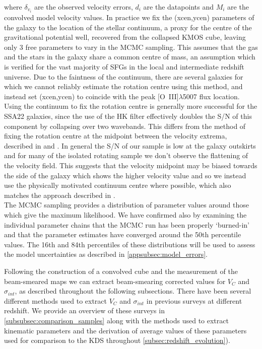 \documentclass[fleqn,usenatbib]{mn2e}
\begin{document}
\noindent
where $\delta_{v_{i}}$ are the observed velocity errors, $d_{i}$ are the datapoints and $M_{i}$ are the convolved model velocity values.
In practice we fix the (xcen,ycen) parameters of the galaxy to the location of the stellar continuum, a proxy for the centre of the gravitational potential well, recovered from the collapsed KMOS cube, leaving only 3 free parameters to vary in the MCMC sampling.
This assumes that the gas and the stars in the galaxy share a common centre of mass, an assumption which is verified for the vast majority of SFGs in the local and intermediate redshift universe.
Due to the faintness of the continuum, there are several galaxies for which we cannot reliably estimate the rotation centre using this method, and instead set (xcen,ycen) to coincide with the peak [O~{\sc III}]$\lambda$5007 flux location.
Using the continuum to fix the rotation centre is generally more successful for the SSA22 galaxies, since the use of the HK filter effectively doubles the S/N of this component by collapsing over two wavebands.
This differs from the method of fixing the rotation centre at the midpoint between the velocity extrema, described in \cite{Wisnioski2015} and \cite{Rodrigues2016}.
In general the S/N of our sample is low at the galaxy outskirts and for many of the isolated rotating sample we don't observe the flattening of the velocity field.
This suggests that the velocity midpoint may be biased towards the side of the galaxy which shows the higher velocity value and so we instead use the physically motivated continuum centre where possible, which also matches the approach described in \cite{Harrison2017}. \\

The MCMC sampling provides a distribution of parameter values around those which give the maximum likelihood.
We have confirmed also by examining the individual parameter chains that the MCMC run has been properly `burned-in' and that the parameter estimates have converged around the 50th percentile values.
The 16th and 84th percentiles of these distributions will be used to assess the model uncertainties as described in \cref{appsubsec:model_errors}.

Following the construction of a convolved cube and the measurement of the beam-smeared maps we can extract beam-smearing corrected values for $V_{C}$ and $\sigma_{int}$, as described throughout the following subsections.
There have been several different methods used to extract $V_{C}$ and $\sigma_{int}$ in previous surveys at different redshift.
We provide an overview of these surveys in \cref{subsubsec:comparison_samples} along with the methods used to extract kinematic parameters and the derivation of average values of these parameters used for comparison to the KDS throughout  \cref{subsec:redshift_evolution}).
\end{document}
